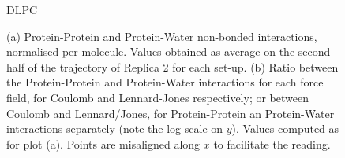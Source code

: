 \begin{figure}[h!]
\centering
\vspace{3cm}
 DLPC​
\caption[(SI) Replica 2: Non-bonded protein energy contribution to capsule structures]{(a) Protein-Protein and Protein-Water non-bonded interactions, normalised per molecule. Values obtained as average on the second half of the trajectory of Replica 2 for each set-up. (b) Ratio between the Protein-Protein and Protein-Water interactions for each force field, for Coulomb and Lennard-Jones respectively; or between Coulomb and Lennard/Jones, for Protein-Protein an Protein-Water interactions separately (note the log scale on $y$). Values computed as for plot (a). Points are misaligned along $x$ to facilitate the reading.}
\label{fig:eng_cg2}
\vspace{3cm}
\end{figure}


